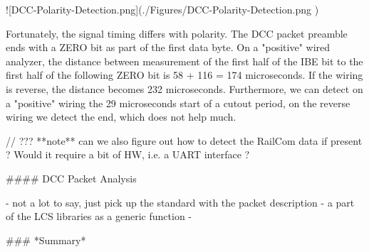 ![DCC-Polarity-Detection.png](./Figures/DCC-Polarity-Detection.png )

Fortunately, the signal timing differs with polarity. The DCC packet preamble ends with a ZERO bit as part of the first data byte. On a "positive" wired analyzer, the distance between measurement of the first half of the IBE bit to the first half of the following ZERO bit is 58 + 116 = 174 microseconds. If the wiring is reverse, the distance becomes 232 microseconds. Furthermore, we can detect on a "positive" wiring the 29 microseconds start of a cutout period, on the reverse wiring we detect the end, which does not help much.

// ??? **note** can we also figure out how to detect the RailCom data if present ? Would it require a bit of HW, i.e. a UART interface ?

#### DCC Packet Analysis

- not a lot to say, just pick up the standard with the packet description
- a part of the LCS libraries as a generic function
- 

### *Summary*
